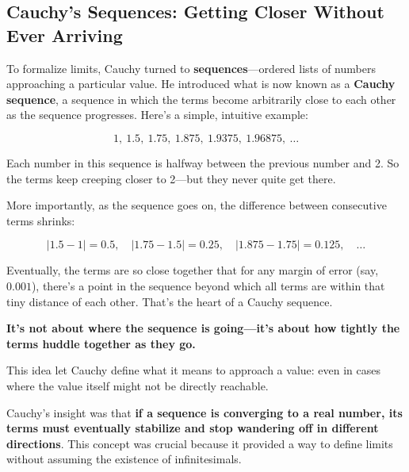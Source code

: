 \subsection{Cauchy’s Sequences: Getting Closer Without Ever Arriving}

To formalize limits, Cauchy turned to \textbf{sequences}—ordered lists of numbers approaching a particular value. He introduced what is now known as a \textbf{Cauchy sequence}, a sequence in which the terms become arbitrarily close to each other as the sequence progresses.  Here’s a simple, intuitive example:

\[
1,\ 1.5,\ 1.75,\ 1.875,\ 1.9375,\ 1.96875,\ \dots
\]

Each number in this sequence is halfway between the previous number and 2. So the terms keep creeping closer to 2—but they never quite get there.

More importantly, as the sequence goes on, the difference between consecutive terms shrinks:

\[
|1.5 - 1| = 0.5,\quad |1.75 - 1.5| = 0.25,\quad |1.875 - 1.75| = 0.125,\quad \dots
\]

Eventually, the terms are so close together that for any margin of error (say, $0.001$), there’s a point in the sequence beyond which all terms are within that tiny distance of each other. That’s the heart of a Cauchy sequence.

\textbf{It’s not about where the sequence is going—it’s about how tightly the terms huddle together as they go.}



This idea let Cauchy define what it means to approach a value: even in cases where the value itself might not be directly reachable.

Cauchy’s insight was that \textbf{if a sequence is converging to a real number, its terms must eventually stabilize and stop wandering off in different directions}. This concept was crucial because it provided a way to define limits without assuming the existence of infinitesimals.




